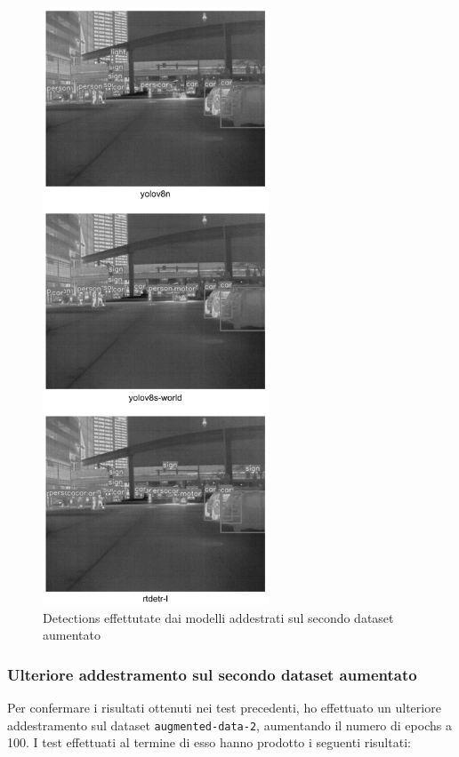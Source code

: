 \begin{figure}[ht]
    \centering
    \includegraphics[width=0.6\textwidth]{files/capitoli/4-sperimentazione-risultati/assets/augmented-data-2-detections.png}
    \caption{\label{fig:augmented-data-2-detections}Detections effettutate dai modelli addestrati sul secondo dataset aumentato}
\end{figure}

\clearpage

\subsubsection{Ulteriore addestramento sul secondo dataset aumentato}
Per confermare i risultati ottenuti nei test precedenti, ho effettuato un ulteriore addestramento sul dataset \texttt{augmented-data-2}, aumentando il numero di epochs a 100. I test effettuati al termine di esso hanno prodotto i seguenti risultati:

